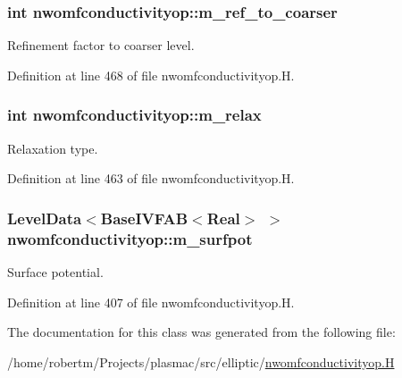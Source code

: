 \subsubsection[{\texorpdfstring{m\+\_\+ref\+\_\+to\+\_\+coarser}{m_ref_to_coarser}}]{\setlength{\rightskip}{0pt plus 5cm}int nwomfconductivityop\+::m\+\_\+ref\+\_\+to\+\_\+coarser\hspace{0.3cm}{\ttfamily [protected]}}\hypertarget{classnwomfconductivityop_a0027b126df3299719608e457ab0ac22d}{}\label{classnwomfconductivityop_a0027b126df3299719608e457ab0ac22d}


Refinement factor to coarser level. 



Definition at line 468 of file nwomfconductivityop.\+H.

\subsubsection[{\texorpdfstring{m\+\_\+relax}{m_relax}}]{\setlength{\rightskip}{0pt plus 5cm}int nwomfconductivityop\+::m\+\_\+relax\hspace{0.3cm}{\ttfamily [protected]}}\hypertarget{classnwomfconductivityop_a106ae6d195e5b5cb4a5f3afe5e7786d1}{}\label{classnwomfconductivityop_a106ae6d195e5b5cb4a5f3afe5e7786d1}


Relaxation type. 



Definition at line 463 of file nwomfconductivityop.\+H.

\subsubsection[{\texorpdfstring{m\+\_\+surfpot}{m_surfpot}}]{\setlength{\rightskip}{0pt plus 5cm}Level\+Data$<$Base\+I\+V\+F\+AB$<$Real$>$ $>$ nwomfconductivityop\+::m\+\_\+surfpot\hspace{0.3cm}{\ttfamily [protected]}}\hypertarget{classnwomfconductivityop_a6482955f92eebf55beae4895d1d48f30}{}\label{classnwomfconductivityop_a6482955f92eebf55beae4895d1d48f30}


Surface potential. 



Definition at line 407 of file nwomfconductivityop.\+H.



The documentation for this class was generated from the following file\+:\begin{DoxyCompactItemize}
\item 
/home/robertm/\+Projects/plasmac/src/elliptic/\hyperlink{nwomfconductivityop_8H}{nwomfconductivityop.\+H}\end{DoxyCompactItemize}
